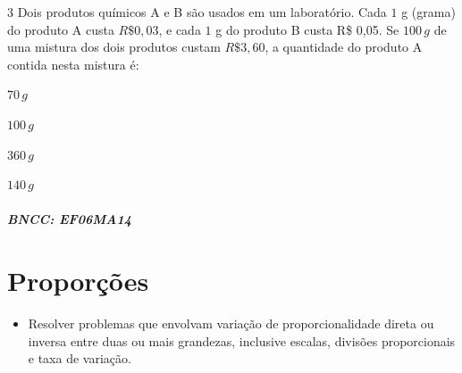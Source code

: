 {\num{3}  Dois produtos químicos A e B são usados em um laboratório. Cada $1$ g
(grama) do produto A custa $R\$0,03$, e cada $1$ g do produto B custa R\$
0,05. Se $100\,g$ de uma mistura dos dois produtos custam $R\$3,60$, a
quantidade do produto A contida nesta mistura é:

\begin{escolha}
\item $70\,g$
\item $100\,g$
\item $360\,g$
\item $140\,g$
\end{escolha}

\paragraph{BNCC: EF06MA14 }


\chapter{Proporções}

\begin{itemize}
\item Resolver problemas que envolvam variação de
proporcionalidade direta ou inversa entre duas ou mais grandezas,
inclusive escalas, divisões proporcionais e taxa de variação.
\end{itemize}

}
